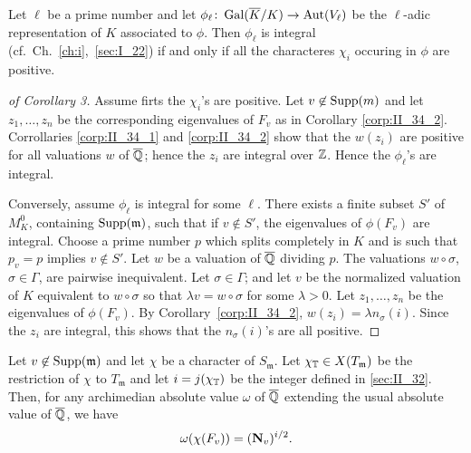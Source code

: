 \begin{corp}\label{corp:II_34_3}
Let $\ell$ be a prime number and let $\phi_\ell \colon \operatorname{Gal}(\overline{K}
/K) \rightarrow \operatorname{Aut}(V_\ell)$ be the $\ell$-adic representation of $K$ 
associated to $\phi$. Then $\phi_\ell$ is integral (cf.\ Ch.~\ref{ch:i},~\ref{sec:I_22}) if
and only if all the characteres $\chi_i$ occuring in $\phi$ are positive.
\end{corp}

\begin{proof}[ of Corollary 3]
Assume firts the $\chi_i$'s are positive. Let $v \not\in \operatorname{Supp}(m)$ and let
$z_1,\dots,z_n$ be the corresponding eigenvalues of
\dpage
$F_v$ as in Corollary \ref{corp:II_34_2}. Corrollaries \ref{corp:II_34_1} and 
\ref{corp:II_34_2} show that the $w(z_i)$ are positive for all valuations $w$
of $\overline{\mathbb{Q}}$; hence the $z_i$ are integral over $\mathbb{Z}$. Hence the $\phi_\ell$'s
are integral.

Conversely, assume $\phi_\ell$ is integral for some $\ell$. There exists a 
finite subset $S'$ of $M_K^0$, containing $\operatorname{Supp}(\mathfrak{m})$, such that if
$v \not\in S'$, the eigenvalues of $\phi(F_v)$ are integral. Choose a prime
number $p$ which splits completely in $K$ and is such that $p_v = p$ implies
$v \not\in S'$. Let $w$ be a valuation of $\overline{\mathbb{Q}}$ dividing $p$. The
valuations $w \circ \sigma$, $\sigma \in \Gamma$, are pairwise inequivalent.
Let $\sigma \in \Gamma$; and let $v$ be the normalized valuation of $K$ 
equivalent to $w \circ \sigma$ so that $\lambda v = w \circ \sigma$ for some
$\lambda > 0$. Let $z_1,\dots,z_n$ be the eigenvalues of $\phi(F_v)$. By
Corollary~\ref{corp:II_34_2}, $w(z_i) = \lambda n_\sigma (i)$. Since the $z_i$ 
are integral, this shows that the $n_\sigma(i)$'s are all positive.
\end{proof}

\begin{prop}\label{prop:II_34_2}
Let $v \not\in \operatorname{Supp}(\mathfrak{m})$ and let $\chi$ be a character of
$S_{\mathfrak{m}}$. Let $\chi_{\mathbb{T}} \in X(T_{\mathfrak{m}})$ be the restriction
of $\chi$ to $T_{\mathfrak{m}}$ and let $i = j(\chi_{\mathbb{T}})$ be the integer
defined in \ref{sec:II_32}.  Then, for any archimedian absolute value $\omega$
of $\overline{\mathbb{Q}}$ extending the usual absolute value of $\overline{\mathbb{Q}}$, we have
\[
	\omega(\chi (F_v)) = (\operatorname{\mathbf{N}}_v)^{i/2}.
\]
\end{prop}

